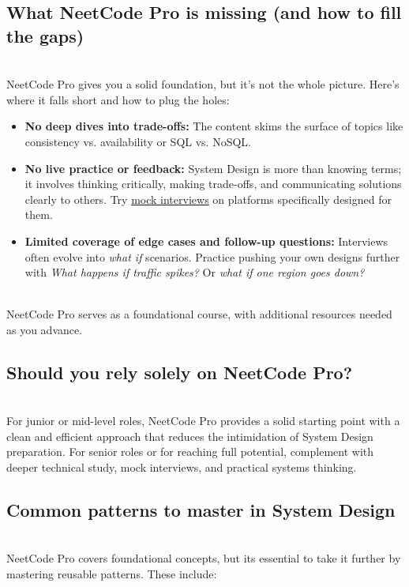\subsection{What NeetCode Pro is missing (and how to fill the gaps)}\label{1BHUWFz7pXDuKj6Z53s3c}
\\
NeetCode Pro gives you a solid foundation, but it's not the whole picture. Here's where it falls short and how to plug the holes:

\begin{itemize}
\item
\protect{}\label{TDu8OBOQfTq8al4_Zu_9L}
\textbf{No deep dives into trade-offs:} The content skims the surface of topics like consistency vs. availability or SQL vs. NoSQL.~
\item
\protect{}\label{i9FIcbScIYuy4CaihN3Oq}
\textbf{No live practice or feedback:} System Design is more than knowing terms; it involves thinking critically, making trade-offs, and communicating solutions clearly to others. Try \href{https://www.educative.io/mock-interview}{\ul{mock interviews}} on platforms specifically designed for them.~
\item
\protect{}\label{b9ytJ5xnb_W4LPTYAQy-z}
\textbf{Limited coverage of edge cases and follow-up questions:} Interviews often evolve into \emph{what if} scenarios. Practice pushing your own designs further with \emph{What happens if traffic spikes?} Or \emph{what if one region goes down?}
\end{itemize}
\\
NeetCode Pro serves as a foundational course, with additional resources needed as you advance.

\subsection{Should you rely solely on NeetCode Pro?}\label{zG7_4k5PGqKFm8s4MOLoL}
\\
For junior or mid-level roles, NeetCode Pro provides a solid starting point with a clean and efficient approach that reduces the intimidation of System Design preparation. For senior roles or for reaching full potential, complement with deeper technical study, mock interviews, and practical systems thinking.

\subsection{Common patterns to master in System Design}\label{2wLUsoO54aAjNWBwfdDbh}
\\
NeetCode Pro covers foundational concepts, but it\textquotesingle s essential to take it further by mastering reusable patterns. These include:


